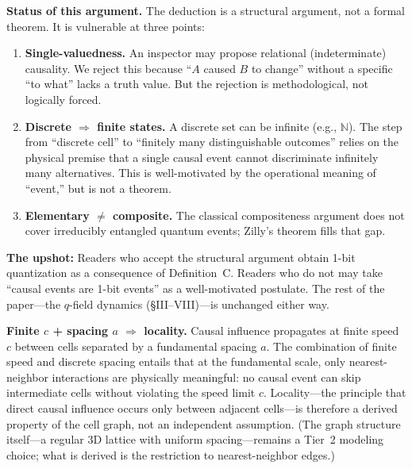 \documentclass[aps,prd,twocolumn,showpacs,superscriptaddress,preprintnumbers]{revtex4-2}
\begin{document}
\textbf{Status of this argument.} The deduction is a structural argument, not a formal theorem. It is vulnerable at three points:
\begin{enumerate}
    \item \textbf{Single-valuedness.} An inspector may propose relational (indeterminate) causality. We reject this because ``$A$ caused $B$ to change'' without a specific ``to what'' lacks a truth value. But the rejection is methodological, not logically forced.
    \item \textbf{Discrete $\Rightarrow$ finite states.} A discrete set can be infinite (e.g., $\mathbb{N}$). The step from ``discrete cell'' to ``finitely many distinguishable outcomes'' relies on the physical premise that a single causal event cannot discriminate infinitely many alternatives. This is well-motivated by the operational meaning of ``event,'' but is not a theorem.
    \item \textbf{Elementary $\neq$ composite.} The classical compositeness argument does not cover irreducibly entangled quantum events; Zilly's theorem fills that gap.
\end{enumerate}
\textbf{The upshot:} Readers who accept the structural argument obtain 1-bit quantization as a consequence of Definition~C. Readers who do not may take ``causal events are 1-bit events'' as a well-motivated postulate. The rest of the paper---the $q$-field dynamics (§III--VIII)---is unchanged either way.

\textbf{Finite $c$ + spacing $a$ $\Rightarrow$ locality.}
Causal influence propagates at finite speed $c$ between cells separated by a fundamental spacing $a$. The combination of finite speed and discrete spacing entails that at the fundamental scale, only nearest-neighbor interactions are physically meaningful: no causal event can skip intermediate cells without violating the speed limit $c$. Locality---the principle that direct causal influence occurs only between adjacent cells---is therefore a derived property of the cell graph, not an independent assumption. (The graph structure itself---a regular 3D lattice with uniform spacing---remains a Tier~2 modeling choice; what is derived is the restriction to nearest-neighbor edges.)
\end{document}
